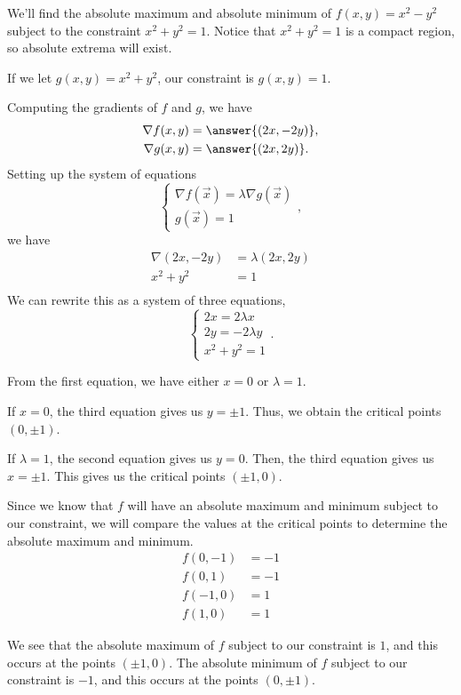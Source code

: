 \documentclass{ximera}
\begin{document}
\begin{example}
We'll find the absolute maximum and absolute minimum of $f(x,y) = x^2-y^2$ subject to the constraint $x^2+y^2=1$. Notice that $x^2+y^2=1$ is a compact region, so absolute extrema will exist.

If we let $g(x,y) = x^2+y^2$, our constraint is $g(x,y) = 1$.

Computing the gradients of $f$ and $g$, we have
\begin{align*}
\nabla f(x,y) &= \answer{(2x, -2y)},\\
\nabla g(x,y) &= \answer{(2x, 2y)}.
\end{align*}
Setting up the system of equations
\[\begin{cases}
\nabla f(\vec{x}) = \lambda \nabla g(\vec{x})\\
g(\vec{x}) = 1
\end{cases}, \]
we have
\begin{align*}
\nabla (2x,-2y) &= \lambda (2x, 2y)\\
x^2+y^2&=1\\
\end{align*}
We can rewrite this as a system of three equations,
\[\begin{cases}
2x=2\lambda x\\
2y=-2\lambda y\\
x^2 +y^2 =1
\end{cases}. \]

From the first equation, we have either $x=0$ or $\lambda =1$.

If $x=0$, the third equation gives us $y=\pm 1$. Thus, we obtain the critical points $(0,\pm 1)$.

If $\lambda =1$, the second equation gives us $y=0$. Then, the third equation gives us $x = \pm 1$. This gives us the critical points $(\pm 1, 0)$.

Since we know that $f$ will have an absolute maximum and minimum subject to our constraint, we will compare the values at the critical points to determine the absolute maximum and minimum.
\begin{align*}
f(0,-1) &= -1\\
f(0,1) &= -1\\
f(-1,0) &= 1\\
f(1,0) &=1
\end{align*}

We see that the absolute maximum of $f$ subject to our constraint is $1$, and this occurs at the points $(\pm 1, 0)$. The absolute minimum of $f$ subject to our constraint is $-1$, and this occurs at the points $(0,\pm 1)$. 
\end{example}
\end{document}
